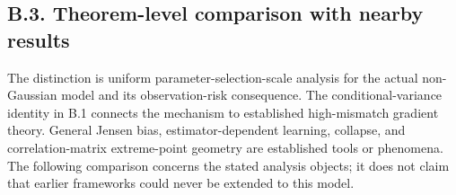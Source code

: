\documentclass{article}
\begin{document}
\subsection*{B.3. Theorem-level comparison with nearby
results}\label{b.3.-theorem-level-comparison-with-nearby-results}

The distinction is uniform parameter-selection-scale analysis for the
actual non-Gaussian model and its observation-risk consequence. The
conditional-variance identity in B.1 connects the mechanism to
established high-mismatch gradient theory. General Jensen bias,
estimator-dependent learning, collapse, and correlation-matrix
extreme-point geometry are established tools or phenomena. The following
comparison concerns the stated analysis objects; it does not claim that
earlier frameworks could never be extended to this model.
\end{document}
